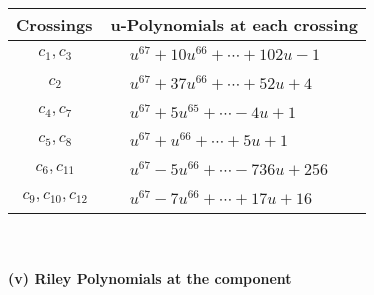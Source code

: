 \documentclass[1p]{elsarticle_modified}
\theoremstyle{definition}
\begin{document}
\begin{tabular}{m{50pt}|m{274pt}}
Crossings & \hspace{64pt}u-Polynomials at each crossing \\
\hline $$\begin{aligned}c_{1},c_{3}\end{aligned}$$&$\begin{aligned}
&u^{67}+10 u^{66}+\cdots+102 u-1
\end{aligned}$\\
\hline $$\begin{aligned}c_{2}\end{aligned}$$&$\begin{aligned}
&u^{67}+37 u^{66}+\cdots+52 u+4
\end{aligned}$\\
\hline $$\begin{aligned}c_{4},c_{7}\end{aligned}$$&$\begin{aligned}
&u^{67}+5 u^{65}+\cdots-4 u+1
\end{aligned}$\\
\hline $$\begin{aligned}c_{5},c_{8}\end{aligned}$$&$\begin{aligned}
&u^{67}+u^{66}+\cdots+5 u+1
\end{aligned}$\\
\hline $$\begin{aligned}c_{6},c_{11}\end{aligned}$$&$\begin{aligned}
&u^{67}-5 u^{66}+\cdots-736 u+256
\end{aligned}$\\
\hline $$\begin{aligned}c_{9},c_{10},c_{12}\end{aligned}$$&$\begin{aligned}
&u^{67}-7 u^{66}+\cdots+17 u+16
\end{aligned}$\\
\hline
\end{tabular}\\~\\
\newpage\renewcommand{\arraystretch}{1}
\flushleft \textbf{(v) Riley Polynomials at the component}\newline \\
\end{document}
